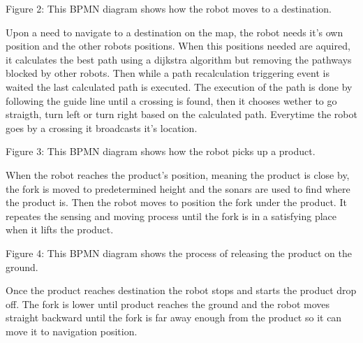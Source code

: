 Figure 2: This BPMN diagram shows how the robot moves to a destination.

Upon a need to navigate to a destination on the map, the robot needs it's own position and the other robots positions. When this positions needed are aquired, it calculates the best path using a dijkstra algorithm but removing the pathways blocked by other robots. Then while a path recalculation triggering event is waited the last calculated path is executed. The execution of the path is done by following the guide line until a crossing is found, then it chooses wether to go straigth, turn left or turn right based on the calculated path. Everytime the robot goes by a crossing it broadcasts it's location.


Figure 3: This BPMN diagram shows how the robot picks up a product.

When the robot reaches the product's position, meaning the product is close by, the fork is moved to predetermined height and the sonars are used to find where the product is. Then the robot moves to position the fork under the product. It repeates the sensing and moving process until the fork is in a satisfying place when it lifts the product.


Figure 4: This BPMN diagram shows the process of releasing the product on the ground.

Once the product reaches destination the robot stops and starts the product drop off. The fork is lower until product reaches the ground and the robot moves straight backward until the fork is far away enough from the product so it can move it to navigation position.


